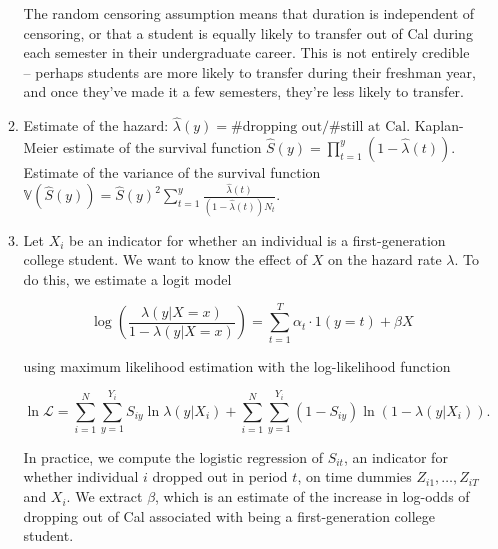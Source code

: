 \documentclass{article}
\begin{document}
\begin{enumerate}
\begin{enumerate}
		The random censoring assumption means that duration is independent of censoring, or that a student is equally likely to transfer out of Cal during each semester in their undergraduate career. This is not entirely credible -- perhaps students are more likely to transfer during their freshman year, and once they've made it a few semesters, they're less likely to transfer.

		\item 

		Estimate of the hazard: $\hat{\lambda}(y) = \text{\# dropping out}/\text{\# still at Cal}$. Kaplan-Meier estimate of the survival function $\hat{S}(y) = \prod \limits_{t=1}^y (1 - \hat{\lambda}(t))$. Estimate of the variance of the survival function $\mathbb{V}(\hat{S}(y)) = \hat{S}(y)^2 \sum \limits_{t=1}^{y} \frac{\hat{\lambda}(t)}{(1-\hat{\lambda}(t))N_t}$.

		\item

		Let $X_i$ be an indicator for whether an individual is a first-generation college student. We want to know the effect of $X$ on the hazard rate $\lambda$. To do this, we estimate a logit model

		$$\log \left( \frac{\lambda(y|X=x)}{1 - \lambda(y|X=x)} \right) = \sum \limits_{t=1}^{T} \alpha_t \cdot 1(y=t) + \beta X$$

		using maximum likelihood estimation with the log-likelihood function

		$$\ln \mathcal{L} = \sum \limits_{i=1}^N \sum \limits_{y=1}^{Y_i} S_{iy} \ln \lambda(y|X_i) + \sum \limits_{i=1}^N \sum \limits_{y=1}^{Y_i} (1 - S_{iy}) \ln (1 - \lambda(y|X_i)).$$

		In practice, we compute the logistic regression of $S_{it}$, an indicator for whether individual $i$ dropped out in period $t$, on time dummies $Z_{i1}, \ldots, Z_{iT}$ and $X_i$. We extract $\beta$, which is an estimate of the increase in log-odds of dropping out of Cal associated with being a first-generation college student.

	\end{enumerate}

\end{enumerate}
\end{document}
